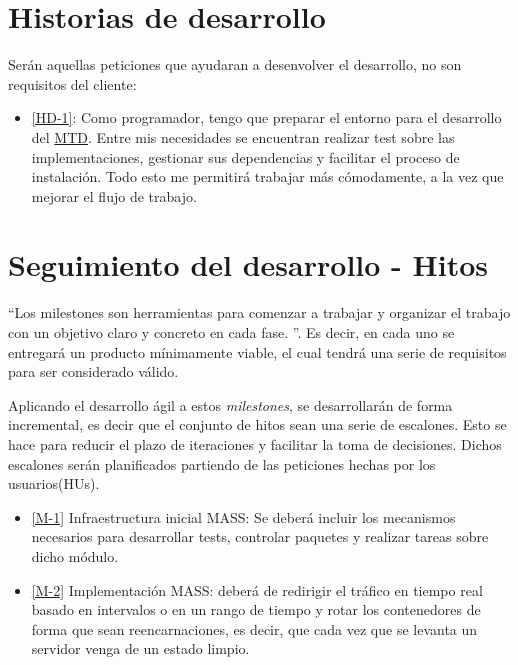\section{Historias de desarrollo}
Serán aquellas peticiones que ayudaran a desenvolver el desarrollo, no son requisitos del cliente:

\begin{itemize}
    \item \href{https://github.com/marcosrmartin/MTD_Server/issues/16}{[HD-1]}: Como programador, tengo que preparar el entorno para el desarrollo del \href{https://github.com/marcosrmartin/MTD_Server/commit/20df5bb6f5af3de7e557c254ad47089db34845aa}{MTD}. Entre mis necesidades se encuentran realizar test sobre las implementaciones, gestionar sus dependencias y facilitar el proceso de instalación. Todo esto me permitirá trabajar más cómodamente, a la vez que mejorar el flujo de trabajo.
\end{itemize}

\section{Seguimiento del desarrollo - Hitos}
``Los milestones son herramientas para comenzar a trabajar y organizar el trabajo con un objetivo claro y concreto en cada fase.
''\cite{iv}. Es decir, en cada uno se entregará un producto mínimamente viable, el cual tendrá una serie de requisitos para ser considerado válido.

Aplicando el desarrollo ágil a estos \textit{milestones}, se desarrollarán de forma incremental, es decir que el conjunto de hitos sean una serie de escalones. Esto se hace para reducir el plazo de iteraciones y facilitar la toma de decisiones. Dichos escalones serán planificados partiendo de las peticiones hechas por los usuarios(HUs).


\begin{itemize}
    \item \href{https://github.com/marcosrmartin/MTD_Server/milestone/3}{[M-1]} Infraestructura inicial MASS: Se deberá incluir los mecanismos necesarios para desarrollar tests, controlar paquetes y realizar tareas sobre dicho módulo.
    \item \href{https://github.com/marcosrmartin/MTD_Server/milestone/2}{[M-2]} Implementación MASS: deberá de redirigir el tráfico en tiempo real basado en intervalos o en un rango de tiempo y rotar los contenedores de forma que sean reencarnaciones, es decir, que cada vez que se levanta un servidor venga de un estado limpio.
\end{itemize}

